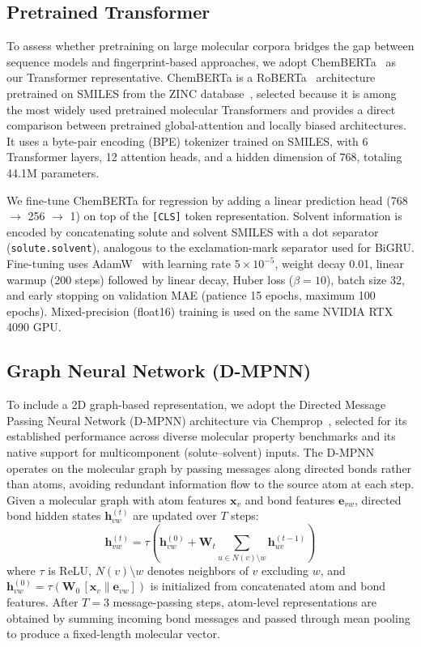 \documentclass[11pt,a4paper]{article}
\newcommand{\vect}[1]{\mathbf{#1}}
\newcommand{\matr}[1]{\mathbf{#1}}
\begin{document}
\FloatBarrier
\subsection{Pretrained Transformer}
\label{sec:chemberta}

To assess whether pretraining on large molecular corpora bridges the gap between sequence models and fingerprint-based approaches, we adopt ChemBERTa~\cite{chithrananda2020chemberta} as our Transformer representative.
ChemBERTa is a RoBERTa~\cite{liu2019roberta} architecture pretrained on SMILES from the ZINC database~\cite{irwin2005zinc}, selected because it is among the most widely used pretrained molecular Transformers and provides a direct comparison between pretrained global-attention and locally biased architectures.
It uses a byte-pair encoding (BPE) tokenizer trained on SMILES, with 6 Transformer layers, 12 attention heads, and a hidden dimension of 768, totaling 44.1M parameters.

We fine-tune ChemBERTa for regression by adding a linear prediction head (768 $\to$ 256 $\to$ 1) on top of the \texttt{[CLS]} token representation.
Solvent information is encoded by concatenating solute and solvent SMILES with a dot separator (\texttt{solute.solvent}), analogous to the exclamation-mark separator used for BiGRU.
Fine-tuning uses AdamW~\cite{loshchilov2019decoupled} with learning rate $5 \times 10^{-5}$, weight decay 0.01, linear warmup (200 steps) followed by linear decay, Huber loss ($\beta = 10$), batch size 32, and early stopping on validation MAE (patience 15 epochs, maximum 100 epochs).
Mixed-precision (float16) training is used on the same NVIDIA RTX 4090 GPU.


\subsection{Graph Neural Network (D-MPNN)}
\label{sec:chemprop}

To include a 2D graph-based representation, we adopt the Directed Message Passing Neural Network (D-MPNN) architecture via Chemprop~\cite{yangAnalyzingLearnedMolecular2019}, selected for its established performance across diverse molecular property benchmarks and its native support for multicomponent (solute--solvent) inputs.
The D-MPNN operates on the molecular graph by passing messages along directed bonds rather than atoms, avoiding redundant information flow to the source atom at each step.
Given a molecular graph with atom features $\vect{x}_v$ and bond features $\vect{e}_{vw}$, directed bond hidden states $\vect{h}_{vw}^{(t)}$ are updated over $T$ steps:
\begin{equation}
    \vect{h}_{vw}^{(t)} = \tau\!\left(\vect{h}_{vw}^{(0)} + \matr{W}_t \sum_{u \in N(v) \setminus w} \vect{h}_{uv}^{(t-1)}\right)
\end{equation}
where $\tau$ is ReLU, $N(v) \setminus w$ denotes neighbors of $v$ excluding $w$, and $\vect{h}_{vw}^{(0)} = \tau(\matr{W}_0 \, [\vect{x}_v \| \vect{e}_{vw}])$ is initialized from concatenated atom and bond features.
After $T = 3$ message-passing steps, atom-level representations are obtained by summing incoming bond messages and passed through mean pooling to produce a fixed-length molecular vector.
\end{document}
